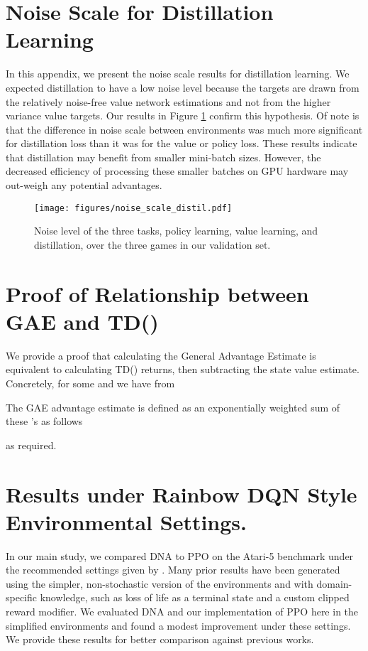 \documentclass{article}
\begin{document}
\clearpage

\section{Noise Scale for Distillation Learning}
\label{app:distil_noise}

In this appendix, we present the noise scale results for distillation learning. We expected distillation to have a low noise level because the targets are drawn from the relatively noise-free value network estimations and not from the higher variance value targets. Our results in Figure \ref{fig:distil_noise} confirm this hypothesis. Of note is that the difference in noise scale between environments was much more significant for distillation loss than it was for the value or policy loss. These results indicate that distillation may benefit from smaller mini-batch sizes. However, the decreased efficiency of processing these smaller batches on GPU hardware may out-weigh any potential advantages.

\begin{figure}[h]
    \centering
    \texttt{[image: figures/noise\_scale\_distil.pdf]}
    \caption{Noise level of the three tasks, policy learning, value learning, and distillation, over the three games in our validation set.}
    \label{fig:distil_noise}
\end{figure}

\section{Proof of Relationship between GAE and TD()}
\label{app:td}

We provide a proof that calculating the General Advantage Estimate \cite{schulman2015high} is equivalent to calculating TD() returns, then subtracting the state value estimate. Concretely, for some  and  we have from \cite{schulman2015high}



The GAE advantage estimate is defined as an exponentially weighted sum of these 's as follows



as required.

\section{Results under Rainbow DQN Style Environmental Settings.}
\label{app:easy}

In our main study, we compared DNA to PPO on the Atari-5 benchmark under the recommended settings given by \cite{machado2018revisiting}. Many prior results have been generated using the simpler, non-stochastic version of the environments and with domain-specific knowledge, such as loss of life as a terminal state and a custom clipped reward modifier. We evaluated DNA and our implementation of PPO here in the simplified environments and found a modest improvement under these settings. We provide these results for better comparison against previous works.
\end{document}
